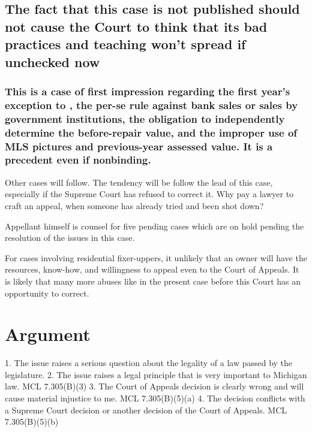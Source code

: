 \documentclass[12pt,\documentclassflag]{michiganCourtOfAppealsBrief}
\begin{document}





\subsection{The fact that this case is not published should not cause the Court to think that its bad practices and teaching won't spread if unchecked now}

\subsubsection{This is a case of first impression regarding the first year's exception to \mathieuGast, the per-se rule against bank sales or sales by government institutions, the obligation to independently determine the before-repair value, and the improper use of MLS pictures and previous-year assessed value. It is a precedent even if nonbinding.}

Other cases will follow. The tendency will be follow the lead of this case, especially if the Supreme Court has refused to correct it. Why pay a lawyer to craft an appeal, when someone has already tried and been shot down?

Appellant himself is counsel for five pending cases which are on hold pending the resolution of the issues in this case.

For cases involving residential fixer-uppers, it unlikely that an owner will have the resources, know-how, and willingness to appeal even to the Court of Appeals. It is likely that many more abuses like in the present case before this Court has an opportunity to correct.


\section{Argument}


1. The issue raises a serious question about the legality of a law passed by the legislature.
2. The issue raises a legal principle that is very important to Michigan law. MCL 7.305(B)(3)
3. The Court of Appeals decision is clearly wrong and will cause material injustice to me. MCL 7.305(B)(5)(a)
4. The decision conflicts with a Supreme Court decision or another decision of the Court of Appeals. MCL 7.305(B)(5)(b)
\end{document}
